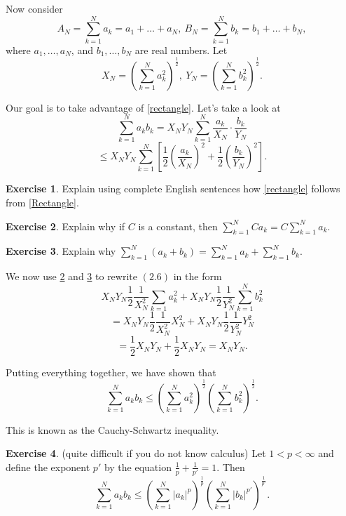 \documentclass[]{amsart}
\numberwithin{equation}{section}
\theoremstyle{plain}
\theoremstyle{definition}
\newtheorem{exercise}{Exercise}[section]
\theoremstyle{remark}
\begin{document}
Now consider
$$ A_N=\sum_{k=1}^N a_k=a_1+\dots+a_N, \ B_N=\sum_{k=1}^N
b_k=b_1+\dots+b_N, $$ where
$a_1, \dots, a_N$, and $b_1, \dots, b_N$ are real numbers. Let
$$ X_N={\left(\sum_{k=1}^N a_k^2 \right)}^{\frac{1}{2}}, \
Y_N={\left(\sum_{k=1}^N b_k^2 \right)}^{\frac{1}{2}}. $$

Our goal is to take advantage of \ref{rectangle}. Let's take a look at
$$ \sum_{k=1}^N a_kb_k=X_N Y_N \sum_{k=1}^N \frac{a_k}{X_N} \cdot
\frac{b_k}{Y_N}$$
\begin{equation} \label{Rectangle} \leq X_NY_N \sum_{k=1}^N
\left[\frac{1}{2}{\left(\frac{a_k}{X_N}\right)}^2+
\frac{1}{2}{\left(\frac{b_k}{Y_N}\right)}^2\right]. \end{equation}

\begin{exercise} Explain using complete English sentences how \ref{rectangle} follows from \ref{Rectangle}. \end{exercise} 

\begin{exercise} \label{prelim2} Explain why if $C$ is a constant, then $\sum_{k=1}^N Ca_k=C\sum_{k=1}^N a_k$. \end{exercise}

\begin{exercise} \label{prelim3} Explain why $\sum_{k=1}^N (a_k+b_k)=\sum_{k=1}^N a_k+\sum_{k=1}^N b_k$. \end{exercise}

We now use \ref{prelim2} and \ref{prelim3} to rewrite $(2.6)$ in the form
$$ X_NY_N \frac{1}{2} \frac{1}{X^2_N} \sum_{k=1} a_k^2+X_NY_N
\frac{1}{2} \frac{1}{Y^2_N}\sum_{k=1}^N b_k^2$$
$$=X_NY_N \frac{1}{2} \frac{1}{X^2_N} X_N^2+X_NY_N
\frac{1}{2} \frac{1}{Y^2_N}Y_N^2$$
$$=\frac{1}{2}X_NY_N+\frac{1}{2}X_NY_N=X_NY_N. $$

Putting everything together, we have shown that
\begin{equation} \label{2rectangle} \sum_{k=1}^N a_k b_k \leq {\left(\sum_{k=1}^N a_k^2
\right)}^{\frac{1}{2}} {\left(\sum_{k=1}^N b_k^2
\right)}^{\frac{1}{2}}. \end{equation}

This is known as the Cauchy-Schwartz inequality.

\begin{exercise} (quite difficult if you do not know calculus) Let
$1<p<\infty$ and define the exponent $p'$ by
the equation $\frac{1}{p}+\frac{1}{p'}=1$. Then
\begin{equation} \label{prectangle}
\sum_{k=1}^N a_k b_k \leq {\left(\sum_{k=1}^N {|a_k|}^p
\right)}^{\frac{1}{p}} {\left(\sum_{k=1}^N {|b_k|}^{p'}
\right)}^{\frac{1}{p'}}. 
\end{equation} \end{exercise}
\end{document}
